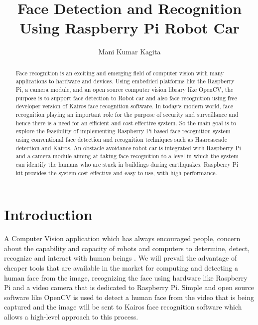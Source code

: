 \documentclass[sigconf]{acmart}
\begin{document}
\title{Face Detection and Recognition Using Raspberry Pi Robot Car}

\author{Mani Kumar Kagita}


\begin{abstract}
Face recognition is an exciting and emerging field of computer vision with many 
applications to hardware and devices. Using embedded platforms like the Raspberry Pi, 
a camera module, and an open source computer vision library like OpenCV, the purpose 
is to support face detection to Robot car and also face recognition using free 
developer version of Kairos face recognition software.
In today`s modern world, face recognition playing an important role for the purpose 
of security and surveillance and hence there is a need for an efficient and cost-effective 
system. So the main goal is to explore the feasibility of implementing Raspberry Pi based 
face recognition system using conventional face detection and recognition techniques such 
as Haarcascade detection and Kairos. An obstacle avoidance robot car is integrated with 
Raspberry Pi and a camera module aiming at taking face recognition to a level in which 
the system can identify the humans who are stuck in buildings during earthquakes. 
Raspberry Pi kit provides the system cost effective and easy to use, with high performance.

\end{abstract}


\maketitle

\section{Introduction}
A Computer Vision application which has always encouraged people, concern about the 
capability and capacity of robots and computers to determine, detect, recognize and 
interact with human beings \cite{Boris2014}. We will prevail the advantage of cheaper
tools that are available in the market for computing and detecting a human face from 
the image, recognizing the face using hardware like Raspberry Pi and a video camera 
that is dedicated to Raspberry Pi. Simple and open source software like OpenCV is 
used to detect a human face from the video that is being captured and the image will 
be sent to Kairos face recognition software which allows a high-level approach to this 
process.
\end{document}
